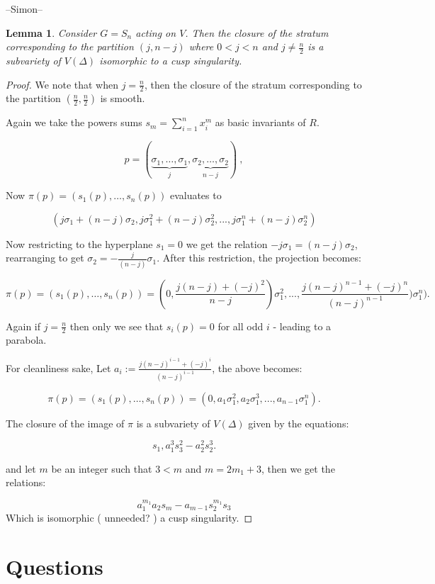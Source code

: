 \documentclass[letter,11pt]{amsart}
\newcommand{\sm}[1]{{\color{pink} #1}}
\theoremstyle{theorem}
\newtheorem{lem}[Thm]{Lemma}
\theoremstyle{remark}
\theoremstyle{definition}
\begin{document}
--Simon--

\begin{lem}
Consider $G=S_n$ acting on $V$. Then the closure of the stratum corresponding to the partition $(j,n-j)$ where $0<j<n$ and $j \neq \frac{n}{2}$ is a subvariety of $V(\Delta)$ isomorphic to a cusp singularity.
\end{lem}
\begin{proof}
We note that when $j=\frac{n}{2}$, then the closure of the stratum corresponding to the partition $(\frac{n}{2},\frac{n}{2})$ is smooth. 

Again we take the powers sums $s_m=\sum_{i=1}^nx_i^m$ as basic invariants of $R$.

$$p=(\underbrace{\sigma_1, \ldots, \sigma_1}_{j}, \underbrace{\sigma_2, \ldots, \sigma_2}_{n-j}) \ ,$$

Now $\pi(p)=(s_1(p), \ldots, s_n(p))$ evaluates to 

$$(j\sigma_1+(n-j)\sigma_2,j\sigma_1^2+(n-j)\sigma_2^2,..., j\sigma_1^n+(n-j)\sigma_2^n)$$

Now restricting to the hyperplane $s_1 = 0$ we get the relation $-j\sigma_1=(n-j)\sigma_2$, rearranging to get $\sigma_2= -\frac{j}{(n-j)}\sigma_1$. After this restriction, the projection becomes:

 $$\pi(p)=(s_1(p), \ldots, s_n(p))= (0,\frac{j(n-j)+(-j)^2}{n-j})\sigma_1^2,...,\frac{j(n-j)^{n-1}+(-j)^n}{(n-j)^{n-1}}) \sigma_1^n).$$
 
 Again if $j=\frac{n}{2}$ then only we see that $s_i(p)=0$ for all odd $i$ - leading to a parabola.
 
 
For cleanliness sake, Let $a_i :=\frac{j(n-j)^{i-1}+(-j)^i}{(n-j)^{i-1}}$, the above becomes:

$$\pi(p)=(s_1(p), \ldots, s_n(p))= (0,a_1\sigma_1^2,a_2\sigma_1^3,...,a_{n-1}\sigma_1^n).$$


The closure of the image of $\pi$ is a subvariety of $V(\Delta)$ given by the equations:

$$s_1, a_1^3s_3^2-a_2^2s_2^3.$$

and let $m$ be an integer such that $3<m$ and $m=2m_1+3$, then we get the relations:

$$a_1^{m_1}a_2s_m - a_{m-1}s_2^{m_1}s_3$$
Which is isomorphic (\sm{unneeded?} ) a cusp singularity.

\end{proof}

\section{Questions}
\end{document}
